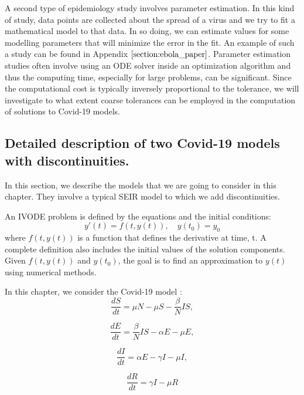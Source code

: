 A second type of epidemiology study involves parameter estimation. In this kind of study, data points are collected about the spread of a virus and we try to fit a mathematical model to that data. In so doing, we can estimate values for some modelling parameters that will minimize the error in the fit. An example of such a study can be found in Appendix $\ref{section:ebola_paper}$. Parameter estimation studies often involve using an ODE solver inside an optimization algorithm and thus the computing time, especially for large problems, can be significant. Since the computational cost is typically inversely proportional to the tolerance, we will investigate to what extent coarse tolerances can be employed in the computation of solutions to Covid-19 models.

\subsection{Detailed description of two Covid-19 models with discontinuities.} 
\label{subsection:SEIR_model}
In this section, we describe the models that we are going to consider in this chapter. They involve a typical SEIR model to which we add discontinuities.

An IVODE problem is defined by the equations and the initial conditions:
\begin{equation}
y'(t) = f(t, y(t)), \quad y(t_0) = y_0 \nonumber
\end{equation}
where $f(t, y(t))$ is a function that defines the derivative at time, t. A complete definition also includes the initial values of the solution components. Given $f(t, y(t))$ and $y(t_0)$, the goal is to find an approximation to  $y(t)$ using numerical methods. 

In this chapter, we consider the Covid-19 model \cite{pdeModel}:
\begin{equation}
\frac{\textit{d}S}{\textit{dt}} = \mu N - \mu S - \frac{\beta}{N}IS, \nonumber
\end{equation}

\begin{equation}
\frac{\textit{d}E}{\textit{dt}} = \frac{\beta}{N}IS - \alpha E - \mu E, \nonumber
\end{equation}

\begin{equation}
\frac{\textit{d}I}{\textit{dt}} = \alpha E - \gamma I - \mu I, \nonumber
\end{equation}

\begin{equation}
\frac{\textit{d}R}{\textit{dt}} = \gamma I - \mu R \nonumber
\end{equation} 

